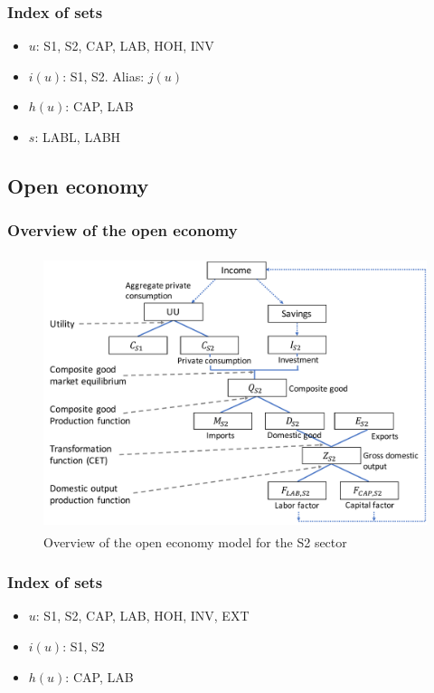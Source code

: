 \subsubsection{Index of sets}
\begin{itemize}
	\item $u$: S1, S2, CAP, LAB, HOH, INV
	\item $i(u)$: S1, S2. Alias: $j(u)$
	\item $h(u)$: CAP, LAB
	\item $s$: LABL, LABH 
\end{itemize}





\clearpage

\subsection{Open economy}
\label{app:open_economy_model}

\subsubsection{Overview of the open economy}
\begin{figure}[!h]
	\centering
	\includegraphics[height=8cm]{figures/overview_open.pdf}
	\caption{Overview of the open economy model for the S2 sector}
	\label{fig:overview_open}
\end{figure}

\subsubsection{Index of sets}
\begin{itemize}
	\item $u$: S1, S2, CAP, LAB, HOH, INV, EXT
	\item $i(u)$: S1, S2
	\item $h(u)$: CAP, LAB
\end{itemize}


